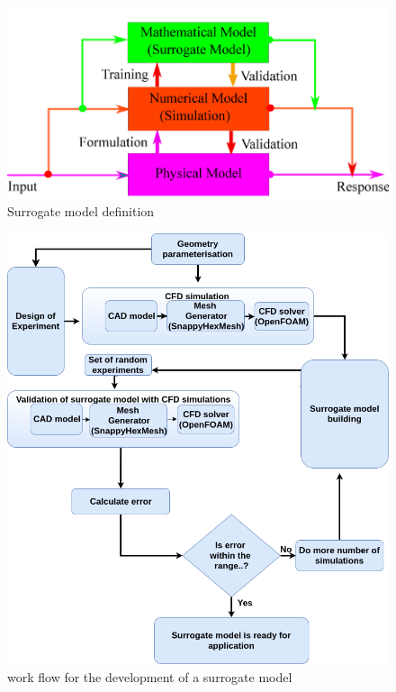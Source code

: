 \begin{figure}[H]
	\includegraphics[width=\textwidth]{optimization/surrogate.png}
	\caption{Surrogate model definition}
	\label{Surrogate model} %
\end{figure}


\begin{figure}[htbp]
	\includegraphics[width=\textwidth]{optimization/flow_chart.png}
  
	\caption{work flow for the development of a surrogate model}
	\label{fig:work flow for the development of a surrogate model} %
\end{figure}


